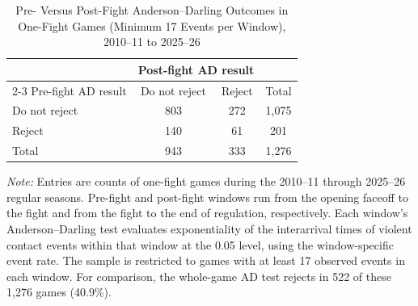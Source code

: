 \begin{table}[htbp]
\centering
\caption{Pre- Versus Post-Fight Anderson--Darling Outcomes in One-Fight Games (Minimum 17 Events per Window), 2010--11 to 2025--26}
\label{tab:one_fight_AD_rejection_min_17_20102011_20252026}
\small
\renewcommand{\arraystretch}{1.15}
\setlength{\tabcolsep}{6pt}

\begin{tabular*}{0.78\textwidth}{@{\extracolsep{\fill}}lccc}
\toprule
 & \multicolumn{2}{c}{Post-fight AD result} & \\
\cmidrule(lr){2-3}
Pre-fight AD result & Do not reject & Reject & Total \\
\midrule
Do not reject & 803 & 272 & 1,075 \\
Reject & 140 & 61 & 201 \\
\midrule
Total & 943 & 333 & 1,276 \\
\bottomrule
\end{tabular*}

\vspace{0.4em}
\parbox{0.78\textwidth}{
\footnotesize
\textit{Note:} Entries are counts of one-fight games during the 2010--11 through 2025--26 regular seasons. Pre-fight and post-fight windows run from the opening faceoff to the fight and from the fight to the end of regulation, respectively. Each window's Anderson--Darling test evaluates exponentiality of the interarrival times of violent contact events within that window at the 0.05 level, using the window-specific event rate. The sample is restricted to games with at least 17 observed events in each window. For comparison, the whole-game AD test rejects in 522 of these 1,276 games (40.9\%).
}
\end{table}
